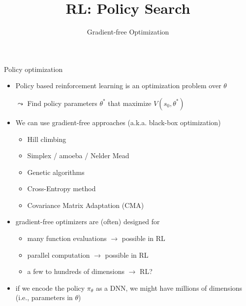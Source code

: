 


\title[RL: Gradient-free]{RL: Policy Search}
\subtitle{Gradient-free Optimization}




	
	\maketitle

\begin{frame}[c]{Policy optimization}

\begin{itemize}
	\item Policy based reinforcement learning is an \alert{optimization} problem over $\theta$
	\item[$\leadsto$] Find policy parameters $\theta^*$ that maximize $V(s_0, \theta^*)$
	\item We can use gradient-free approaches (a.k.a. black-box optimization)
	\begin{itemize}
		\item Hill climbing
		\item Simplex / amoeba / Nelder Mead
		\item Genetic algorithms
		\item Cross-Entropy method
		\item Covariance Matrix Adaptation (CMA)
	\end{itemize}
	\pause
	\smallskip
	\item gradient-free optimizers are (often) designed for
	\begin{itemize}
		\item many function evaluations $\to$ possible in RL
		\item parallel computation $\to$ possible in RL
		\item a few to hundreds of dimensions $\to$ RL?
	\end{itemize}
	\pause
	\item if we encode the policy $\pi_\theta$ as a DNN, we might have \alert{millions} of dimensions (i.e., parameters in $\theta$)

\end{itemize}

\end{frame}
